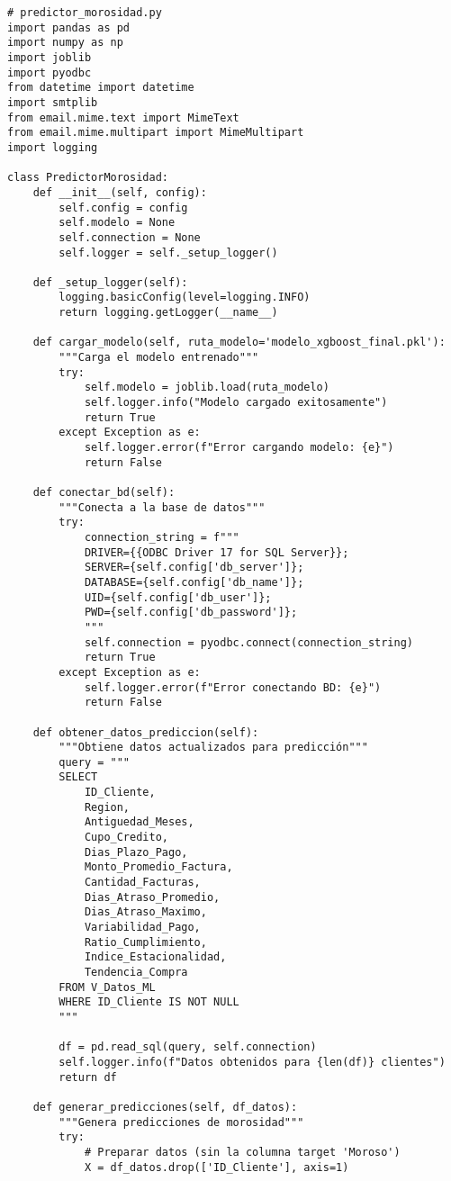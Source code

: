 \begin{verbatim}
# predictor_morosidad.py
import pandas as pd
import numpy as np
import joblib
import pyodbc
from datetime import datetime
import smtplib
from email.mime.text import MimeText
from email.mime.multipart import MimeMultipart
import logging

class PredictorMorosidad:
    def __init__(self, config):
        self.config = config
        self.modelo = None
        self.connection = None
        self.logger = self._setup_logger()
        
    def _setup_logger(self):
        logging.basicConfig(level=logging.INFO)
        return logging.getLogger(__name__)
    
    def cargar_modelo(self, ruta_modelo='modelo_xgboost_final.pkl'):
        """Carga el modelo entrenado"""
        try:
            self.modelo = joblib.load(ruta_modelo)
            self.logger.info("Modelo cargado exitosamente")
            return True
        except Exception as e:
            self.logger.error(f"Error cargando modelo: {e}")
            return False
    
    def conectar_bd(self):
        """Conecta a la base de datos"""
        try:
            connection_string = f"""
            DRIVER={{ODBC Driver 17 for SQL Server}};
            SERVER={self.config['db_server']};
            DATABASE={self.config['db_name']};
            UID={self.config['db_user']};
            PWD={self.config['db_password']};
            """
            self.connection = pyodbc.connect(connection_string)
            return True
        except Exception as e:
            self.logger.error(f"Error conectando BD: {e}")
            return False
    
    def obtener_datos_prediccion(self):
        """Obtiene datos actualizados para predicción"""
        query = """
        SELECT 
            ID_Cliente,
            Region,
            Antiguedad_Meses,
            Cupo_Credito,
            Dias_Plazo_Pago,
            Monto_Promedio_Factura,
            Cantidad_Facturas,
            Dias_Atraso_Promedio,
            Dias_Atraso_Maximo,
            Variabilidad_Pago,
            Ratio_Cumplimiento,
            Indice_Estacionalidad,
            Tendencia_Compra
        FROM V_Datos_ML
        WHERE ID_Cliente IS NOT NULL
        """
        
        df = pd.read_sql(query, self.connection)
        self.logger.info(f"Datos obtenidos para {len(df)} clientes")
        return df
    
    def generar_predicciones(self, df_datos):
        """Genera predicciones de morosidad"""
        try:
            # Preparar datos (sin la columna target 'Moroso')
            X = df_datos.drop(['ID_Cliente'], axis=1)
            

\end{verbatim}
